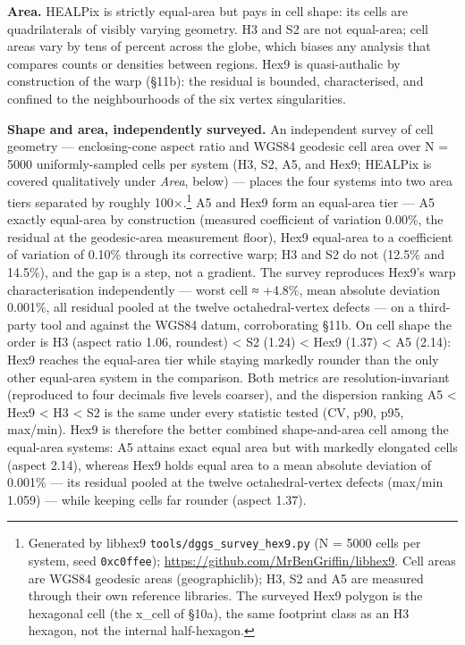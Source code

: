 \documentclass[
  11pt,
  a4paper,
]{article}
\begin{document}
\textbf{Area.} HEALPix is strictly equal-area but pays in cell shape:
its cells are quadrilaterals of visibly varying geometry. H3 and S2 are
not equal-area; cell areas vary by tens of percent across the globe,
which biases any analysis that compares counts or densities between
regions. Hex9 is quasi-authalic by construction of the warp (§11b): the
residual is bounded, characterised, and confined to the neighbourhoods
of the six vertex singularities.

\textbf{Shape and area, independently surveyed.} An independent survey
of cell geometry --- enclosing-cone aspect ratio and WGS84 geodesic cell
area over N = 5000 uniformly-sampled cells per system (H3, S2, A5, and
Hex9; HEALPix is covered qualitatively under \emph{Area}, below) ---
places the four systems into two area tiers separated by roughly
100×.\footnote{Generated by libhex9 \texttt{tools/dggs\_survey\_hex9.py}
  (N = 5000 cells per system, seed \texttt{0xc0ffee});
  \url{https://github.com/MrBenGriffin/libhex9}. Cell areas are WGS84
  geodesic areas (geographiclib); H3, S2 and A5 are measured through
  their own reference libraries. The surveyed Hex9 polygon is the
  hexagonal cell (the x\_cell of §10a), the same footprint class as an
  H3 hexagon, not the internal half-hexagon.} A5 and Hex9 form an
equal-area tier --- A5 exactly equal-area by construction (measured
coefficient of variation 0.00\%, the residual at the geodesic-area
measurement floor), Hex9 equal-area to a coefficient of variation of
0.10\% through its corrective warp; H3 and S2 do not (12.5\% and
14.5\%), and the gap is a step, not a gradient. The survey reproduces
Hex9's warp characterisation independently --- worst cell ≈ +4.8\%, mean
absolute deviation 0.001\%, all residual pooled at the twelve
octahedral-vertex defects --- on a third-party tool and against the
WGS84 datum, corroborating §11b. On cell shape the order is H3 (aspect
ratio 1.06, roundest) \textless{} S2 (1.24) \textless{} Hex9 (1.37)
\textless{} A5 (2.14): Hex9 reaches the equal-area tier while staying
markedly rounder than the only other equal-area system in the
comparison. Both metrics are resolution-invariant (reproduced to four
decimals five levels coarser), and the dispersion ranking A5 \textless{}
Hex9 \textless{} H3 \textless{} S2 is the same under every statistic
tested (CV, p90, p95, max/min). Hex9 is therefore the better combined
shape-and-area cell among the equal-area systems: A5 attains exact equal
area but with markedly elongated cells (aspect 2.14), whereas Hex9 holds
equal area to a mean absolute deviation of 0.001\% --- its residual
pooled at the twelve octahedral-vertex defects (max/min 1.059) --- while
keeping cells far rounder (aspect 1.37).
\end{document}
